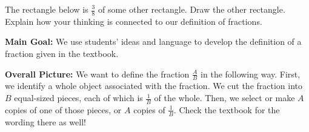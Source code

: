 \documentclass{ximera}
\begin{document}
\begin{problem}
	The rectangle below is $\frac{3}{8}$ of some other rectangle. Draw the other rectangle. Explain how your thinking is connected to our definition of fractions. 
	
	\begin{image}
	\end{image}
\end{problem}





\newpage
\begin{instructorNotes}


{\bf Main Goal:} We use students' ideas and language to develop the definition of a fraction given in the textbook. 


{\bf Overall Picture:} 
We want to define the fraction $\frac{A}{B}$ in the following way. First, we identify a whole object associated with the fraction. We cut the fraction into $B$ equal-sized pieces, each of which is $\frac{1}{B}$ of the whole. Then, we select or make $A$ copies of one of those pieces, or $A$ copies of $\frac{1}{B}$. Check the textbook for the wording there as well!


\end{instructorNotes}
\end{document}
